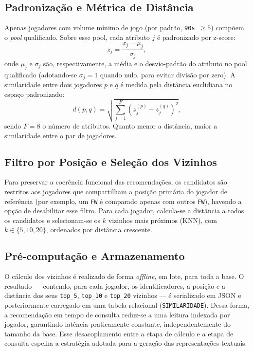 \documentclass[portuguese]{sbc2025}
\begin{document}
\subsection{Padronização e Métrica de Distância}
Apenas jogadores com volume mínimo de jogo (por padrão, \texttt{90s}~$\geq 5$)
compõem o \emph{pool} qualificado. Sobre esse pool, cada atributo $j$ é
padronizado por z-score:
\begin{equation}
z_j = \frac{x_j - \mu_j}{\sigma_j},
\end{equation}
onde $\mu_j$ e $\sigma_j$ são, respectivamente, a média e o desvio-padrão do
atributo no pool qualificado (adotando-se $\sigma_j = 1$ quando nulo, para
evitar divisão por zero). A similaridade entre dois jogadores $p$ e $q$ é medida
pela distância euclidiana no espaço padronizado:
\begin{equation}
d(p, q) = \sqrt{\sum_{j=1}^{F} \left(z_j^{(p)} - z_j^{(q)}\right)^2},
\end{equation}
sendo $F = 8$ o número de atributos. Quanto menor a distância, maior a
similaridade entre o par de jogadores.

\subsection{Filtro por Posição e Seleção dos Vizinhos}
Para preservar a coerência funcional das recomendações, os candidatos são
restritos aos jogadores que compartilham a posição primária do jogador de
referência (por exemplo, um \texttt{FW} é comparado apenas com outros
\texttt{FW}), havendo a opção de desabilitar esse filtro. Para cada jogador,
calcula-se a distância a todos os candidatos e selecionam-se os $k$ vizinhos
mais próximos (KNN), com $k \in \{5, 10, 20\}$, ordenados por distância
crescente.

\subsection{Pré-computação e Armazenamento}
O cálculo dos vizinhos é realizado de forma \emph{offline}, em lote, para toda a
base. O resultado --- contendo, para cada jogador, os identificadores, a posição
e a distância dos seus \texttt{top\_5}, \texttt{top\_10} e \texttt{top\_20}
vizinhos --- é serializado em JSON e posteriormente carregado em uma tabela
relacional (\texttt{SIMILARIDADE}). Dessa forma, a recomendação em tempo de
consulta reduz-se a uma leitura indexada por jogador, garantindo latência
praticamente constante, independentemente do tamanho da base. Esse
desacoplamento entre a etapa de cálculo e a etapa de consulta espelha a
estratégia adotada para a geração das representações textuais.
\end{document}

